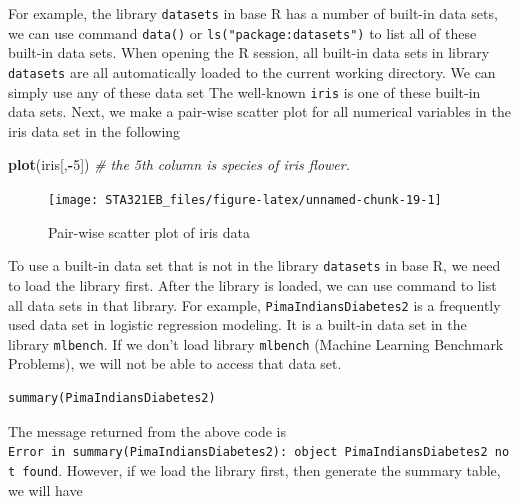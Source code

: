 \documentclass[
]{book}
\newenvironment{Shaded}{\begin{snugshade}}{\end{snugshade}}
\newcommand{\CommentTok}[1]{\textcolor[rgb]{0.56,0.35,0.01}{\textit{#1}}}
\newcommand{\DecValTok}[1]{\textcolor[rgb]{0.00,0.00,0.81}{#1}}
\newcommand{\FunctionTok}[1]{\textcolor[rgb]{0.13,0.29,0.53}{\textbf{#1}}}
\newcommand{\NormalTok}[1]{#1}
\newcommand{\SpecialCharTok}[1]{\textcolor[rgb]{0.81,0.36,0.00}{\textbf{#1}}}
\begin{document}
For example, the library \texttt{datasets} in base R has a number of built-in data sets, we can use command \texttt{data()} or \texttt{ls("package:datasets")} to list all of these built-in data sets. When opening the R session, all built-in data sets in library \texttt{datasets} are all automatically loaded to the current working directory. We can simply use any of these data set The well-known \texttt{iris} is one of these built-in data sets. Next, we make a pair-wise scatter plot for all numerical variables in the iris data set in the following

\begin{Shaded}
\begin{Highlighting}[]
\FunctionTok{plot}\NormalTok{(iris[,}\SpecialCharTok{{-}}\DecValTok{5}\NormalTok{])  }\CommentTok{\# the 5th column is species of iris flower.}
\end{Highlighting}
\end{Shaded}

\begin{figure}

{\centering \texttt{[image: STA321EB\_files/figure-latex/unnamed-chunk-19-1]} 

}

\caption{Pair-wise scatter plot of iris data}\label{fig:unnamed-chunk-19}
\end{figure}

To use a built-in data set that is not in the library \texttt{datasets} in base R, we need to load the library first. After the library is loaded, we can use command to list all data sets in that library. For example, \texttt{PimaIndiansDiabetes2} is a frequently used data set in logistic regression modeling. It is a built-in data set in the library \texttt{mlbench}. If we don't load library \texttt{mlbench} (Machine Learning Benchmark Problems), we will not be able to access that data set.

\begin{verbatim}
summary(PimaIndiansDiabetes2)
\end{verbatim}

The message returned from the above code is \texttt{Error\ in\ summary(PimaIndiansDiabetes2):\ object\ \textquotesingle{}PimaIndiansDiabetes2\textquotesingle{}\ not\ found}. However, if we load the library first, then generate the summary table, we will have
\end{document}
